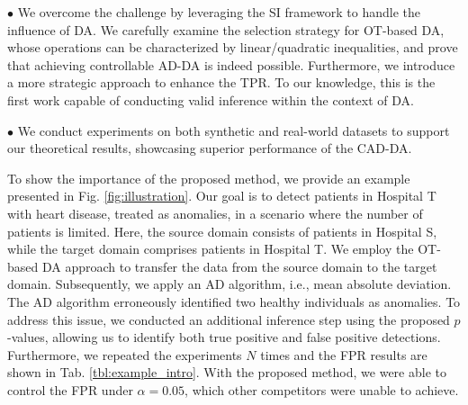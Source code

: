 $\bullet$ We overcome the challenge by leveraging the SI framework to handle the influence of DA.
%
We carefully examine the selection strategy for OT-based DA, whose operations can be characterized by linear/quadratic inequalities, and prove that achieving controllable AD-DA is indeed possible.
%
Furthermore, we introduce a more strategic approach to enhance the TPR.
%
To our knowledge, this is the first work capable of conducting valid inference within the context of DA.


%


$\bullet$ We conduct experiments on both synthetic and real-world datasets to support our theoretical results, showcasing superior performance of the CAD-DA.


\begin{example}
To show the importance of the proposed method, we provide an example presented in Fig. \ref{fig:illustration}.
%
Our goal is to detect patients in Hospital T with heart disease, treated as anomalies, in a scenario where the number of patients is limited.
%
Here, the source domain consists of patients in Hospital S, while the target domain comprises patients in Hospital T.
%
We employ the OT-based DA approach to transfer the data from the source domain to the target domain.
%
Subsequently, we apply an AD algorithm, i.e., mean absolute deviation.
%
The AD algorithm erroneously identified two healthy individuals as anomalies. 
%
To address this issue, we conducted an additional inference step using the proposed $p$-values, allowing us to identify both true positive and false positive detections.
%
Furthermore, we repeated the experiments $N$ times and the FPR results are shown in Tab. \ref{tbl:example_intro}.
%
With the proposed method, we were able to control the FPR under $\alpha = 0.05$, which other competitors were unable to achieve. 
\end{example}


